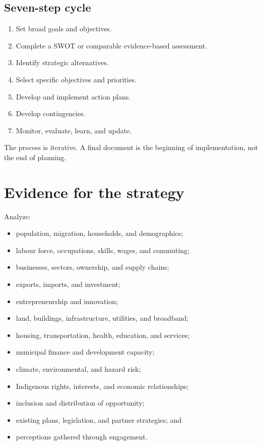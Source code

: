 \documentclass[11pt,letterpaper,oneside,openany]{book}
\begin{document}
\subsection[Seven-step cycle]{Seven-step cycle}
\begin{enumerate}
\item Set broad goals and objectives.
\item Complete a SWOT or comparable evidence-based assessment.
\item Identify strategic alternatives.
\item Select specific objectives and priorities.
\item Develop and implement action plans.
\item Develop contingencies.
\item Monitor, evaluate, learn, and update.
\end{enumerate}


The process is iterative. A final document is the beginning of implementation, not the end of planning.


\section[Evidence for the strategy]{Evidence for the strategy}
Analyze:


\begin{itemize}
\item population, migration, households, and demographics;
\item labour force, occupations, skills, wages, and commuting;
\item businesses, sectors, ownership, and supply chains;
\item exports, imports, and investment;
\item entrepreneurship and innovation;
\item land, buildings, infrastructure, utilities, and broadband;
\item housing, transportation, health, education, and services;
\item municipal finance and development capacity;
\item climate, environmental, and hazard risk;
\item Indigenous rights, interests, and economic relationships;
\item inclusion and distribution of opportunity;
\item existing plans, legislation, and partner strategies; and
\item perceptions gathered through engagement.
\end{itemize}
\end{document}

